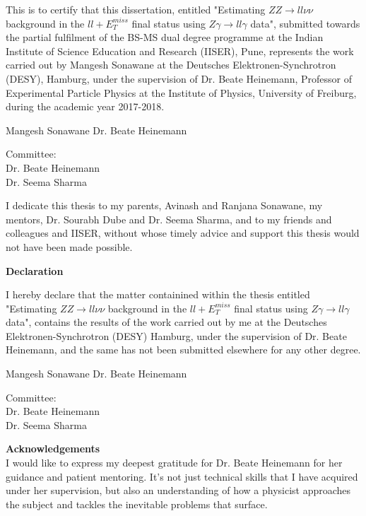 \documentclass[11pt,a4paper,openright,twoside]{report}
\newcommand{\ZZ}{$ZZ\to ll\nu\nu$ }
\newcommand{\Zg}{$Z\gamma\to ll\gamma$ }
\newcommand{\llM}{$ll+E_T^{miss}$ }
\newcommand\blankpage{%
    \null
    \thispagestyle{empty}%
    \addtocounter{page}{-1}%
    \newpage}
\begin{document}
\vspace{1cm}
\normalsize This is to certify that this dissertation, entitled "Estimating \ZZ background in the \llM final status using \Zg data", submitted towards the partial fulfilment of the BS-MS dual degree programme at the Indian Institute of Science Education and Research (IISER), Pune, represents the work carried out by Mangesh Sonawane at the Deutsches Elektronen-Synchrotron (DESY), Hamburg, under the supervision of Dr. Beate Heinemann, Professor of Experimental Particle Physics at the Institute of Physics, University of Freiburg, during the academic year 2017-2018.
\vfill
\begin{center}
Mangesh Sonawane\hspace{8cm}
Dr. Beate Heinemann
\end{center}
\vfill
Committee:\\
Dr. Beate Heinemann\\
Dr. Seema Sharma
\vfill
\vfill
\newpage
\blankpage
\newpage
{}
\vspace*{\fill}
\noindent I dedicate this thesis to my parents, Avinash and Ranjana Sonawane, my mentors, Dr. Sourabh Dube and Dr. Seema Sharma, and to my friends and colleagues and IISER, without whose timely advice and support this thesis would not have been made possible.
\vspace*{\fill}
\newpage
\blankpage
\newpage
\begin{center}
\Huge \textbf{Declaration\\}
\end{center}
\vspace{1cm}
\normalsize I hereby declare that the matter containined within the thesis entitled "Estimating \ZZ background in the \llM final status using \Zg data", contains the results of the work carried out by me at the Deutsches Elektronen-Synchrotron (DESY) Hamburg, under the supervision of Dr. Beate Heinemann, and the same has not been submitted elsewhere for any other degree.
\vfill
\begin{center}
Mangesh Sonawane\hspace{8cm}
Dr. Beate Heinemann
\end{center}
\vfill
Committee:\\
Dr. Beate Heinemann\\
Dr. Seema Sharma
\vfill
\vfill
\newpage
\blankpage
\newpage
{\Huge \textbf{Acknowledgements\vspace{2cm}\\}}
I would like to express my deepest gratitude for Dr. Beate Heinemann for her guidance and patient mentoring. It's not just technical skills that I have acquired under her supervision, but also an understanding of how a physicist approaches the subject and tackles the inevitable problems that surface.\vspace{1cm}
\end{document}
